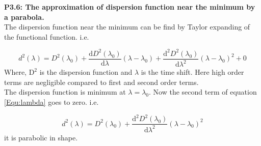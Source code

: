   
  \textbf{P3.6: The approximation of dispersion function near the minimum by a parabola.}\\
  
  The dispersion function near the minimum can be find by Taylor expanding of the functional function. i.e.
  
  \begin{equation}
  d^2(\lambda)=D^2(\lambda_{0}) +\frac{\text{d}D^2(\lambda_{0})}{\text{d}\lambda}(\lambda- \lambda_{0}) + \frac{\text{d}^2 D^2(\lambda_{0})}{\text{d}\lambda^2}(\lambda - \lambda_{0})^2 + 0
  \label{Equ:lambda}
  \end{equation}
  Where, $ \text{D}^2 $ is the dispersion function and $ \lambda $ is the time shift.
  Here high order terms are negligible compared to first and second order terms.\\
  
  The dispersion function is minimum at $ \lambda= \lambda_{0} $. Now the second term of equation \ref{Equ:lambda} goes to zero. i.e.
  
  \begin{equation}
  d^2(\lambda)=D^2(\lambda_{0}) + \frac{\text{d}^2 D^2(\lambda_{0})}{\text{d}\lambda^2}(\lambda - \lambda_{0})^2 
  \end{equation}
  it is parabolic in shape.
